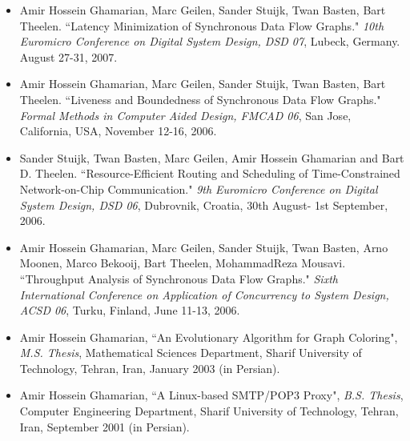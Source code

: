 \begin{itemize}
\item Amir Hossein Ghamarian, Marc Geilen, Sander Stuijk, Twan
Basten, Bart Theelen. ``Latency Minimization of Synchronous Data
Flow Graphs." \emph{10th Euromicro Conference on
Digital System Design, DSD 07}, Lubeck, Germany. August 27-31, 2007.

\item Amir Hossein Ghamarian, Marc Geilen, Sander Stuijk, Twan
Basten, Bart Theelen. ``Liveness and Boundedness of Synchronous Data
Flow Graphs." \emph{Formal Methods in Computer Aided Design, FMCAD
06}, San Jose, California, USA, November 12-16, 2006.

\item Sander Stuijk, Twan Basten, Marc Geilen, Amir Hossein Ghamarian and Bart D.
Theelen. ``Resource-Efficient Routing and Scheduling of
Time-Constrained Network-on-Chip Communication." \emph{9th Euromicro
Conference on Digital System Design, DSD 06}, Dubrovnik, Croatia,
30th August- 1st September, 2006.

\item Amir Hossein Ghamarian, Marc Geilen, Sander Stuijk, Twan Basten, Arno Moonen, Marco Bekooij, Bart Theelen, MohammadReza Mousavi.
``Throughput Analysis of Synchronous Data Flow Graphs." \emph{Sixth
International Conference on Application of Concurrency to System
Design, ACSD 06}, Turku, Finland, June 11-13, 2006.

\item Amir Hossein Ghamarian, ``An Evolutionary Algorithm for Graph
Coloring", \emph{M.S. Thesis}, Mathematical Sciences Department,
Sharif University of Technology, Tehran, Iran, January 2003 (in
Persian).

\item Amir Hossein Ghamarian, ``A Linux-based SMTP/POP3 Proxy", \emph{B.S.
Thesis}, Computer Engineering Department, Sharif University of
Technology, Tehran, Iran, September 2001 (in Persian).
\end{itemize}
